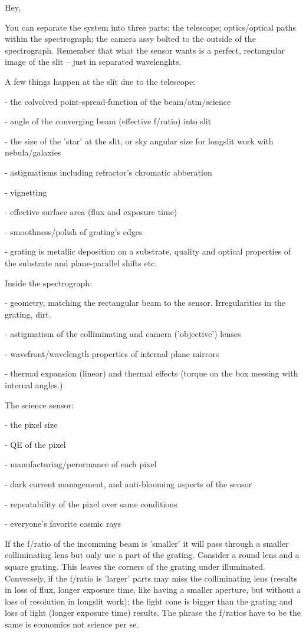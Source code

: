 Hey,

You can separate the system into three parts: the telescope;
optics/optical paths within the spectrograph; the camera assy
bolted to the outside of the spectrograph. Remember that
what the sensor wants is a perfect, rectangular image
of the slit -- just in separated wavelenghts. 

A few things happen at the slit due to the telescope:

- the colvolved point-spread-function of the beam/atm/science

- angle of the converging beam (effective f/ratio) into slit

- the size of the 'star' at the slit, or sky angular
size for longslit work with nebula/galaxies

- astigmatisms including refractor's chromatic abberation

- vignetting

- effective surface area (flux and exposure time)

- smoothness/polish of grating's edges

- grating is metallic deposition on a substrate, quality
and optical properties of the substrate and plane-parallel
shifts etc.


Inside the spectrograph:

- geometry, matching the rectangular beam to the sensor.
Irregularities in the grating, dirt.

- astigmatism of the colliminating and camera ('objective')
lenses

- wavefront/wavelength properties of internal plane mirrors

- thermal expansion (linear) and thermal effects (torque
on the box messing with internal angles.)

The science sensor:

- the pixel size

- QE of the pixel

- manufacturing/perormance of each pixel

- dark current management, and anti-blooming aspects
of the sensor

- repeatability of the pixel over same conditions

- everyone's favorite cosmic rays



If the f/ratio of the incomming beam is 'smaller' it
will pass through a smaller colliminating lens but
only use a part of the grating. Consider a round
lens and a square grating. This leaves the corners
of the grating under illuminated. Conversely, if
the f/ratio is 'larger' parts may miss the colliminating
lens (results in loss of flux, longer exposure time,
like having a smaller aperture, but without a loss
of resolution in longslit work); the light cone is
bigger than the grating and loss of light (longer
exposure time) results.  The phrase the f/ratios
have to be the same is economics not science per se.

